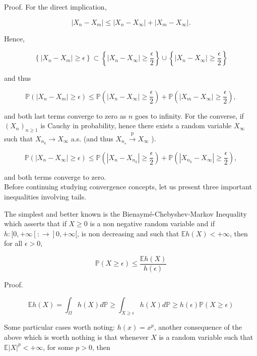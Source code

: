 \documentclass{amsbook}
\theoremstyle{plain}%
\theoremstyle{definition}
\theoremstyle{remark}
\begin{document}
Proof. For the direct implication,

$$
\left|X_{n}-X_{m}\right| \leq\left|X_{n}-X_{\infty}\right|+\left|X_{m}-X_{\infty}\right| .
$$

Hence,

$$
\left\{\left|X_{n}-X_{m}\right| \geq \epsilon\right\} \subset\left\{\left|X_{n}-X_{\infty}\right| \geq \frac{\epsilon}{2}\right\} \cup\left\{\left|X_{n}-X_{\infty}\right| \geq \frac{\epsilon}{2}\right\}
$$

and thus

$$
\mathbb{P}\left(\left|X_{n}-X_{m}\right| \geq \epsilon\right) \leq \mathbb{P}\left(\left|X_{n}-X_{\infty}\right| \geq \frac{\epsilon}{2}\right)+\mathbb{P}\left(\left|X_{m}-X_{\infty}\right| \geq \frac{\epsilon}{2}\right),
$$

and both last terms converge to zero as $n$ goes to infinity. For the converse, if $\left(X_{n}\right)_{n \geq 1}$ is Cauchy in probability, hence there exists a random variable $X_{\infty}$ such that $X_{n_{k}} \rightarrow X_{\infty}$ a.s. (and thus $X_{n_{\star}} \xrightarrow{\mathrm{p}} X_{\infty}$ ).

$$
\mathbb{P}\left(\left|X_{n}-X_{\infty}\right| \geq \epsilon\right) \leq \mathbb{P}\left(\left|X_{n}-X_{n_{k}}\right| \geq \frac{\epsilon}{2}\right)+\mathbb{P}\left(\left|X_{n_{k}}-X_{\infty}\right| \geq \frac{\epsilon}{2}\right),
$$

and both terms converge to zero.\\
Before continuing studying convergence concepts, let us present three important inequalities involving tails.

The simplest and better known is the Bienaymé-Chebyshev-Markov Inequality which asserts that if $X \geq 0$ is a non negative random variable and if $h:[0,+\infty[: \rightarrow] 0,+\infty[$, is non decreasing and such that $\mathbb{E} h(X)<+\infty$, then for all $\epsilon>0$,

    $$
    \mathbb{P}(X \geq \epsilon) \leq \frac{\mathbb{E} h(X)}{h(\epsilon)}
    $$

    Proof.

    $$
    \mathbb{E} h(X)=\int_{\Omega} h(X) d \mathbb{P} \geq \int_{X \geq \epsilon} h(X) d \mathbb{P} \geq h(\epsilon) \mathbb{P}(X \geq \epsilon)
    $$

    Some particular cases worth noting: $h(x)=x^{p}$, another consequence of the above which is worth nothing is that whenever $X$ is a random variable such that $\mathbb{E}|X|^{p}<+\infty$, for some $p>0$, then
\end{document}
